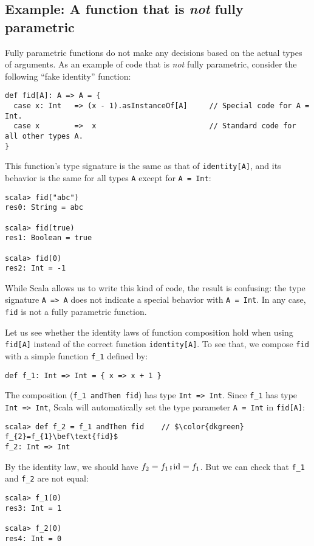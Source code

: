 \subsection{Example: A function that is \emph{not} fully parametric}

Fully parametric functions do not make any decisions based on the
actual types of arguments. As an example of code that is \emph{not}
fully parametric, consider the following \textsf{``}fake identity\textsf{''} function:
\begin{lstlisting}
def fid[A]: A => A = {
  case x: Int   => (x - 1).asInstanceOf[A]     // Special code for A = Int.
  case x        =>  x                          // Standard code for all other types A.
}
\end{lstlisting}
This function\textsf{'}s type signature is the same as that of \lstinline!identity[A]!,
and its behavior is the same for all types \lstinline!A! except for
\lstinline!A = Int!:
\begin{lstlisting}
scala> fid("abc")
res0: String = abc

scala> fid(true)
res1: Boolean = true

scala> fid(0)
res2: Int = -1
\end{lstlisting}
While Scala allows us to write this kind of code, the result is confusing:
the type signature \lstinline!A => A! does not indicate a special
behavior with \lstinline!A = Int!. In any case, \lstinline!fid!
is not a fully parametric function.

Let us see whether the identity laws of function composition hold
when using \lstinline!fid[A]! instead of the correct function \lstinline!identity[A]!.
To see that, we compose \lstinline!fid! with a simple function \lstinline!f_1!
defined by:
\begin{lstlisting}
def f_1: Int => Int = { x => x + 1 }
\end{lstlisting}
The composition (\lstinline!f_1 andThen fid!) has type \lstinline!Int => Int!.
Since \lstinline!f_1! has type \lstinline!Int => Int!, Scala will
automatically set the type parameter \lstinline!A = Int! in \lstinline!fid[A]!:
\begin{lstlisting}[mathescape=true]
scala> def f_2 = f_1 andThen fid    // $\color{dkgreen} f_{2}=f_{1}\bef\text{fid}$
f_2: Int => Int
\end{lstlisting}
By the identity law, we should have $f_{2}=f_{1}\bef\text{id}=f_{1}$.
But we can check that \lstinline!f_1! and \lstinline!f_2! are not
equal:
\begin{lstlisting}
scala> f_1(0)
res3: Int = 1

scala> f_2(0)
res4: Int = 0
\end{lstlisting}

